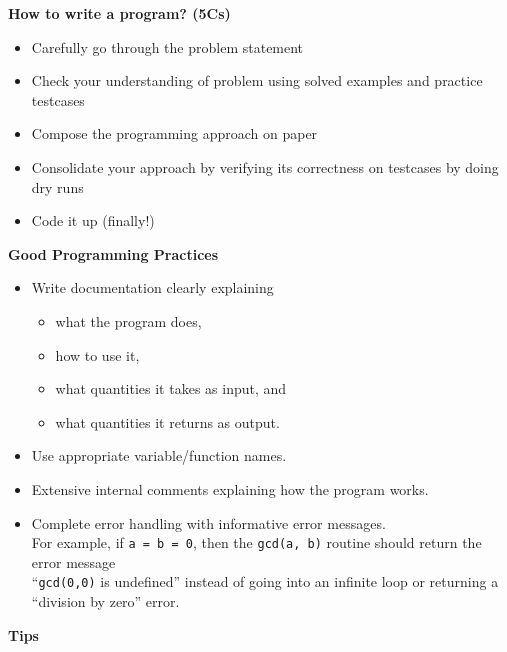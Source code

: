 \begin{center}
	\textbf{\large{How to write a program? (5Cs)}}
\end{center}
\begin{itemize}
\item Carefully go through the problem statement
\item Check your understanding of problem using solved examples and practice testcases
\item Compose the programming approach on paper
\item Consolidate your approach by verifying its correctness on testcases by doing dry runs
\item Code it up (finally!)
\end{itemize}
\begin{center}
	\textbf{\large{Good Programming Practices}}
\end{center}
\begin{itemize}
\item 
Write documentation clearly explaining 
	\begin{itemize}
	\item what the program does,
	\item how to use it,
	\item what quantities it takes as input, and
	\item what quantities it returns as output.
	\end{itemize}
\item
Use appropriate variable/function names.
\item 
Extensive internal comments explaining how the program works.
\item 
Complete error handling with informative error messages.\\
For example, if \verb!a = b = 0!, then the \verb!gcd(a, b)! routine should return the error message \\``\verb!gcd(0,0)! is undefined'' instead of going into an infinite loop or returning a ``division by zero'' error.
\end{itemize}
\begin{center}
	\textbf{\large{Tips}}
\end{center}
